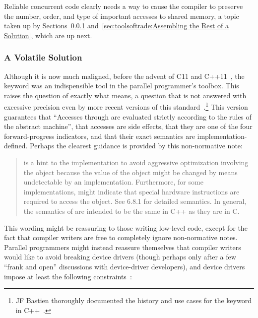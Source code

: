 Reliable concurrent code clearly needs a way to cause the compiler to
preserve the number, order, and type of important accesses to shared
memory, a topic taken up by
Sections~\ref{sec:toolsoftrade:A Volatile Solution}
and~\ref{sec:toolsoftrade:Assembling the Rest of a Solution},
which are up next.

\subsubsection{A Volatile Solution}
\label{sec:toolsoftrade:A Volatile Solution}

Although it is now much maligned, before the advent of C11 and
C++11~\cite{PeteBecker2011N3242}, the  keyword was an
indispensible tool in the parallel programmer's toolbox.
This raises the question of exactly what  means,
a question that is not answered with excessive precision even
by more recent versions of this standard~\cite{RichardSmith2018N4762}.\footnote{
	JF Bastien thoroughly documented the history and use cases
	for the  keyword in
	C++~\cite{JFBastien2018DeprecatingVolatile}.}
This version guarantees that ``Accesses through 
 are evaluated strictly according to the rules of the
abstract machine'',
that  accesses are side effects,
that they are one of the four forward-progress indicators,
and that their exact semantics are implementation-defined.
Perhaps the clearest guidance is provided by this non-normative note:

\begin{quote}
	 is a hint to the implementation to avoid
	aggressive optimization involving the object because the value
	of the object might be changed by means undetectable by an
	implementation.
	Furthermore, for some implementations,  might indicate
	that special hardware instructions are required to access
	the object.
	See 6.8.1 for detailed semantics.
	In general, the semantics of  are intended to be the
	same in C++ as they are in C.
\end{quote}

This wording might be reassuring to those writing low-level code, except
for the fact that compiler writers are free to completely ignore
non-normative notes.
Parallel programmers might instead reassure themselves that compiler
writers would like to avoid breaking device drivers (though perhaps
only after a few ``frank and open'' discussions with device-driver
developers), and device drivers impose at least the following
constraints~\cite{PaulEMcKenney2016P0124R6-LKMM}:

